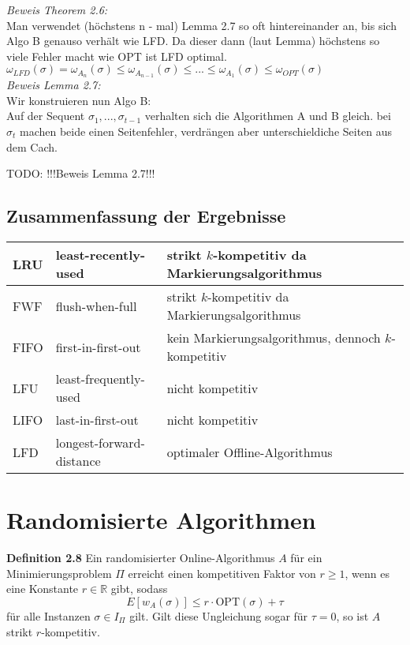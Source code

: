 \textit{Beweis Theorem 2.6:}\\
Man verwendet (höchstens n - mal) Lemma 2.7 so oft hintereinander an, bis sich Algo B genauso verhält wie LFD. Da dieser dann (laut Lemma) höchstens so viele Fehler macht wie OPT ist LFD optimal.\\
$\omega_{LFD}(\sigma) = \omega_{A_{n}}(\sigma) \le \omega_{A_{n-1}}(\sigma) \le ... \le \omega_{A_{1}}(\sigma) \le \omega_{OPT}(\sigma)$ \\

\textit{Beweis Lemma 2.7:}\\
Wir konstruieren nun Algo B: \\
Auf der Sequent $\sigma_{1}, ..., \sigma_{t-1}$ verhalten sich die Algorithmen A und B gleich. bei $\sigma_{t}$ machen beide einen Seitenfehler, verdrängen aber unterschieldiche Seiten aus dem Cach.

TODO: !!!Beweis Lemma 2.7!!!

\subsection{Zusammenfassung der Ergebnisse}

\begin{tabular}{| l | l | l |}
\hline
LRU  & least-recently-used      & strikt $k$-kompetitiv da Markierungsalgorithmus \\ \hline
FWF  & flush-when-full          & strikt $k$-kompetitiv da Markierungsalgorithmus \\ \hline
FIFO & first-in-first-out       & kein Markierungsalgorithmus, dennoch $k$-kompetitiv \\ \hline
LFU  & least-frequently-used    & nicht kompetitiv\\ \hline
LIFO & last-in-first-out        & nicht kompetitiv\\ \hline
LFD  & longest-forward-distance & optimaler Offline-Algorithmus \\ \hline
\end{tabular}



\section{Randomisierte Algorithmen}


\textbf{Definition 2.8} Ein randomisierter Online-Algorithmus $A$ für ein Minimierungsproblem $\Pi$ erreicht einen kompetitiven Faktor von $r \ge 1$, wenn es eine Konstante $r \in \mathbb{R}$ gibt, sodass
$$E[w_A(\sigma)] \leq r \cdot \textrm{OPT}(\sigma) + \tau$$
für alle Instanzen $\sigma \in I_\Pi$ gilt. Gilt diese Ungleichung sogar für $\tau = 0$, so ist $A$ strikt $r$-kompetitiv.

